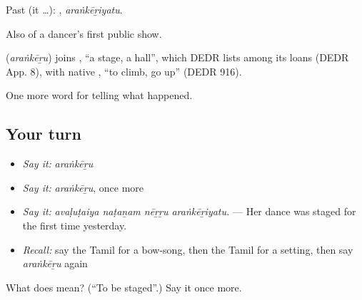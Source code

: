 Past (it …): , \emph{araṅkēṟiyatu}.

Also of a dancer's first public show.

\begin{cousinweb}
\textbf{} (\emph{araṅkēṟu}) joins , \textquotedblleft{}a stage, a hall\textquotedblright{}, which DEDR lists among its loans (DEDR App. 8), with native , \textquotedblleft{}to climb, go up\textquotedblright{} (DEDR 916).
\end{cousinweb}

\begin{grammarlens}[title={What you've built}]
One more word for telling what happened.
\end{grammarlens}

\subsection*{Your turn}
\begin{itemize}
\raggedright
  \item \emph{Say it:} \emph{araṅkēṟu}
  \item \emph{Say it:} \emph{araṅkēṟu}, once more
  \item \emph{Say it:} \emph{avaḷuṭaiya naṭaṉam nēṟṟu araṅkēṟiyatu.} — Her dance was staged for the first time yesterday.
  \item \emph{Recall:} say the Tamil for a bow-song, then the Tamil for a setting, then say \emph{araṅkēṟu} again
\end{itemize}

\begin{tcolorbox}[breakable,colback=teal!4,colframe=teal!35!black,title={Before you move on}]
What does  mean? (\textquotedblleft{}To be staged\textquotedblright{}.) Say it once more.
\end{tcolorbox}
